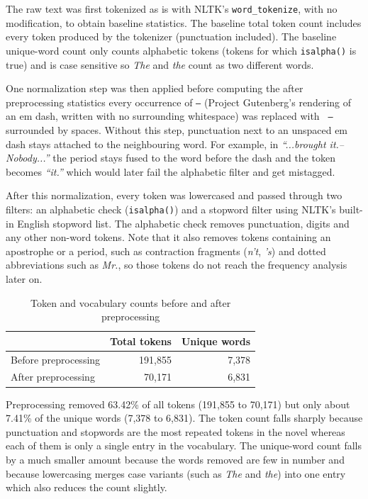 \documentclass[sigconf]{acmart}
\begin{document}
The raw text was first tokenized as is with NLTK's \texttt{word\_tokenize},
with no modification, to obtain baseline statistics. The baseline total
token count includes every token produced by the tokenizer (punctuation
included). The baseline unique-word count only counts alphabetic tokens
(tokens for which \texttt{isalpha()} is true) and is case sensitive so
\textit{The} and \textit{the} count as two different words.

One normalization step was then applied before computing the
after preprocessing statistics every occurrence of \texttt{--} (Project
Gutenberg's rendering of an em dash, written with no surrounding
whitespace) was replaced with \texttt{ -- } surrounded by spaces. Without
this step, punctuation next to an unspaced em dash stays attached to the
neighbouring word. For example, in \textit{``...brought it.--Nobody...''}
the period stays fused to the word before the dash and the token becomes
\textit{``it.''} which would later fail the alphabetic filter and get mistagged. 

After this normalization, every token was lowercased and passed through two
filters: an alphabetic check (\texttt{isalpha()}) and a stopword filter
using NLTK's built-in English stopword list. The alphabetic check removes
punctuation, digits and any other non-word tokens. Note that it also
removes tokens containing an apostrophe or a period, such as contraction
fragments (\textit{n't}, \textit{'s}) and dotted abbreviations such as
\textit{Mr.}, so those tokens do not reach the frequency analysis later on.

\begin{table}[H]
\caption{Token and vocabulary counts before and after preprocessing}
\label{tab:partA}
\centering
\begin{tabular}{lrr}
\toprule
 & Total tokens & Unique words \\
\midrule
Before preprocessing & 191{,}855 & 7{,}378 \\
After preprocessing  & 70{,}171  & 6{,}831 \\
\bottomrule
\end{tabular}
\end{table}

Preprocessing removed 63.42\% of all tokens (191,855 to 70,171) but only
about 7.41\% of the unique words (7,378 to 6,831). The token count falls
sharply because punctuation and stopwords are the most repeated tokens in
the novel whereas each of them is only a single entry in the vocabulary.
The unique-word count falls by a much smaller amount because the words
removed are few in number and because lowercasing merges case variants
(such as \textit{The} and \textit{the}) into one entry which also reduces
the count slightly.
\end{document}
